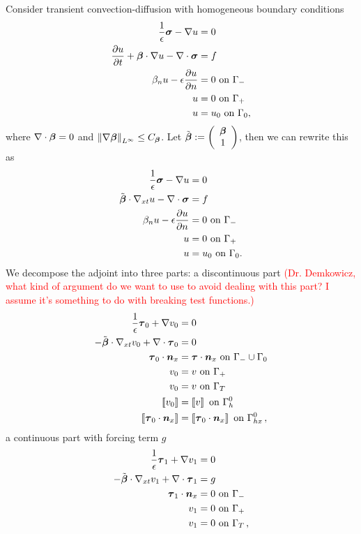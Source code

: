 \documentclass{article}
\begin{document}
Consider transient convection-diffusion with homogeneous boundary conditions
\begin{align*}
\frac{1}{\epsilon}\boldsymbol\sigma-\nabla u &=0\\
\frac{\partial u}{\partial t} + \boldsymbol\beta\cdot\nabla u - \nabla\cdot\boldsymbol\sigma &= f\\
\beta_n u-\epsilon\frac{\partial u}{\partial n} &= 0 \text{ on } \Gamma_-\\
u &= 0 \text{ on } \Gamma_+\\
u &= u_0 \text{ on } \Gamma_0,
\end{align*}
where $\nabla\cdot\boldsymbol\beta=0$ and $\left\| \nabla\boldsymbol\beta \right\|_{L^\infty}\le C_{\boldsymbol\beta}$.
Let $\tilde{\boldsymbol\beta}:=\left( \begin{array}{c} \boldsymbol\beta\\ 1\\ \end{array} \right)$, then we can rewrite this as
\begin{align*}
\frac{1}{\epsilon}\boldsymbol\sigma-\nabla u &=0\\
\tilde{\boldsymbol\beta}\cdot\nabla_{xt} u - \nabla\cdot\boldsymbol\sigma &= f\\
\beta_n u-\epsilon\frac{\partial u}{\partial n} &= 0 \text{ on } \Gamma_-\\
u &= 0 \text{ on } \Gamma_+\\
u &= u_0 \text{ on } \Gamma_0.
\end{align*}
We decompose the adjoint into three parts:
a discontinuous part
\textcolor{red}{(Dr. Demkowicz, what kind of argument do we want to use to avoid dealing with this part? I assume it's something to do with breaking test functions.)}
\begin{align*}
\frac{1}{\epsilon}\bftau_0+\Grad v_0 &=0\\
-\tilde\bfbeta\cdot\Gradxt v_0 + \Div\bftau_0 &= 0\\
\bftau_0\cdot\bfn_x &= \bftau\cdot\bfn_x \text{ on } \Gamma_-\cup\Gamma_0\\
v_0 &= v \text{ on } \Gamma_+\\
v_0 &= v \text{ on } \Gamma_T\\
\jump{v_0}&=\jump{v} \text{ on } \Gamma_h^0\\
\jump{\bftau_0\cdot\bfn_x}&=\jump{\bftau_0\cdot\bfn_x} \text{ on } \Gamma_{hx}^0\,,
\end{align*}
a continuous part with forcing term $g$
\begin{align*}
\frac{1}{\epsilon}\boldsymbol\tau_1+\nabla v_1 &=0\\
-\tilde{\boldsymbol\beta}\cdot\nabla_{xt} v_1 + \nabla\cdot\boldsymbol\tau_1 &= g\\
\boldsymbol\tau_1\cdot\boldsymbol n_x &= 0 \text{ on } \Gamma_-\\
v_1 &= 0 \text{ on } \Gamma_+\\
v_1 &= 0 \text{ on } \Gamma_T\,,
\end{align*}
\end{document}
